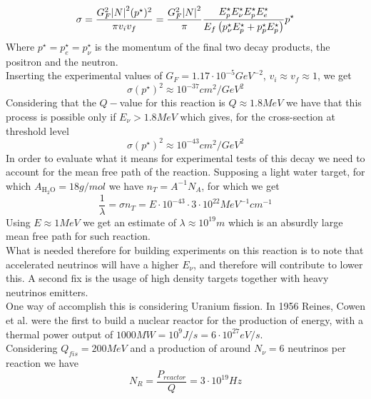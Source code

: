 \documentclass[../qm.tex]{subfiles}
\begin{document}
\begin{equation}
	\sigma=\frac{G_F^2\abs{N}^2(p^\star)^2}{\pi v_i v_f}=\frac{G_F^2\abs{N}^2}{\pi}\frac{E_p^\star E_\nu^\star E_p^\star E_e^\star}{E_f\left(p_\nu^\star E_p^\star+p_p^\star E_p^\star\right)}p^\star
	\label{eq:crossecbeta}
\end{equation}
Where $p^\star=p^\star_e=p^\star_\nu$ is the momentum of the final two decay products, the positron and the neutron.\\
Inserting the experimental values of $G_F=1.17\cdot10^{-5}\unit{GeV^{-2}}$, $v_i\approx v_f\approx1$, we get
\begin{equation*}
	\sigma (p^\star)^2\approx10^{-37}\unit{cm^2/GeV^2}
\end{equation*}
Considering that the $Q-$value for this reaction is $Q\approx1.8\unit{MeV}$ we have that this process is possible only if $E_\nu>1.8\unit{MeV}$ which gives, for the cross-section at threshold level
\begin{equation*}
	\sigma (p^\star)^2\approx10^{-43}\unit{cm^2/GeV^2}
\end{equation*}
In order to evaluate what it means for experimental tests of this decay we need to account for the mean free path of the reaction. Supposing a light water target, for which $A_{\mathrm{H_2O}}=18\unit{g/mol}$ we have $n_T=A^{-1}N_A$, for which we get
\begin{equation*}
	\frac{1}{\lambda}=\sigma n_T=E\cdot10^{-43}\cdot 3\cdot10^{22}\unit{MeV^{-1}cm^{-1}}
\end{equation*}
Using $E\approx1\unit{MeV}$ we get an estimate of $\lambda\approx10^{19}m$ which is an absurdly large mean free path for such reaction.\\
What is needed therefore for building experiments on this reaction is to note that accelerated neutrinos will have a higher $E_\nu$, and therefore will contribute to lower this. A second fix is the usage of high density targets together with heavy neutrinos emitters.\\
One way of accomplish this is considering Uranium fission. In 1956 Reines, Cowen et al. were the first to build a nuclear reactor for the production of energy, with a thermal power output of $1000\unit{MW}=10^9\unit{J/s}=6\cdot10^{27}\unit{eV/s}$.\\
Considering $Q_{fis}=200\unit{MeV}$ and a production of around $N_\nu=6$ neutrinos per reaction we have
\begin{equation*}
	N_R=\frac{P_{reactor}}{Q}=3\cdot10^{19}\unit{Hz}
\end{equation*}
\end{document}

